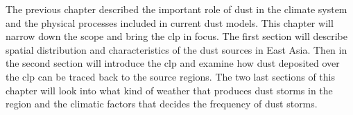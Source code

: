 \label{chap:east_asia_dust}
The previous chapter described the important role of dust in the climate system and the physical processes included in current dust models. This chapter will narrow down the scope and bring the \acrshort{clp} in focus. 
The first section will describe spatial distribution and characteristics of the dust sources in East Asia. 
Then in the second section will introduce the \acrshort{clp} and examine how dust deposited over the \acrshort{clp} can be traced back to the source regions. 
The two last sections of this chapter will look into what kind of weather that produces dust storms in the region and the climatic factors that decides the frequency of dust storms.    

